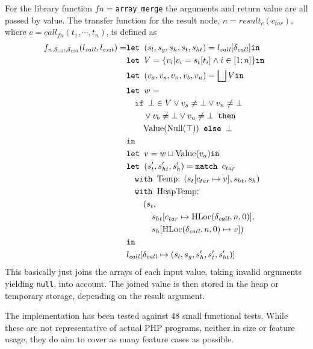 For the library function $fn = $\texttt{array\_merge}  the arguments and return value are all passed by value. The transfer function for the result node, $n = \mathit{result}_{c}(c_{\mathit{tar}})$, where $c = \mathit{call}_{{fn}}(t_1,\cdots, t_n)$, is defined as 
\begin{align*}
f_{n,\delta_{\mathit{call}},\delta_{\mathit{exit}}}(l_{\mathit{call}}, l_{\mathit{exit}}) = 	&\texttt{let } (s_l, s_g, s_h, s_t, s_{ht}) = l_{\mathit{call}}[\delta_{\mathit{call}}] \texttt{in }\notag\\
																							&\texttt{let } V =  \{v_i| v_i = s_t[t_i]\wedge i \in [1;n]\} \texttt{in }\notag\\
																							&\texttt{let } (v_a,v_s, v_n, v_b, v_u) = \bigsqcup V \texttt{in }\notag\\
																							&\texttt{let } w =  \notag\\
																							&\quad\texttt{if }\bot \in V \vee v_s \neq \bot \vee v_n \neq \bot\notag\\
																							&\quad\quad \vee v_b \neq \bot \vee v_u \neq \bot\texttt{ then } \notag\\
																							&\quad\quad\text{Value}(\text{Null}(\top)) \texttt{ else } \bot\notag\\
																							& \texttt{in }\notag\\
																							&\texttt{let } v = w \sqcup \text{Value}(v_a) \texttt{in }\notag\\
																							&\texttt{let } (s_t', s_{ht}',s_h') = \texttt{match }c_{tar}\notag\\
																							&\quad\texttt{with }\text{Temp}\text{: } (s_t[c_{tar}\mapsto v], s_{ht}, s_h)\notag\\
																							&\quad\texttt{with }\text{HeapTemp}\text{: }\notag\\
																							&\quad\quad(s_t, \notag\\
																							&\quad\quad\quad s_{ht}[c_{tar}\mapsto \text{HLoc}(\delta_{\mathit{call}}, n, 0)], \notag\\
																							&\quad\quad\quad s_h[\text{HLoc}(\delta_{\mathit{call}}, n, 0)\mapsto v])\notag\\
																							& \texttt{in }\notag\\
																							&l_{\mathit{call}}[\delta_{\mathit{call}}\mapsto (s_l, s_g, s_h', s_t', s_{ht}')]
\end{align*} 
This basically just joins the arrays of each input value, taking invalid arguments yielding \texttt{null}, into account. The joined value is then stored in the heap or temporary storage, depending on the result argument.

The implementation has been tested against 48 small functional tests. While these are not representative of actual PHP programs, neither in size or feature usage, they do aim to cover as many feature cases as possible.


